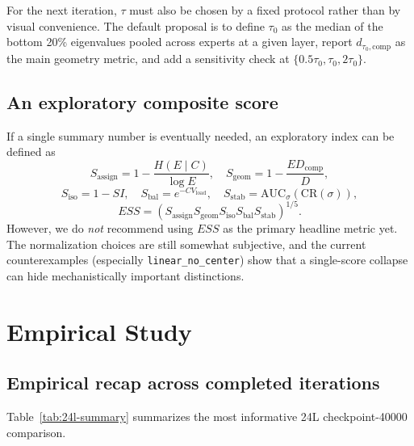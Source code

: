 \documentclass[11pt]{article}
\newcommand{\idea}[1]{\textcolor{red}{[#1]}}
\begin{document}
For the next iteration, $\tau$ must also be chosen by a fixed protocol rather than by visual convenience. The default proposal is to define $\tau_0$ as the median of the bottom 20\% eigenvalues pooled across experts at a given layer, report $d_{\tau_0,\mathrm{comp}}$ as the main geometry metric, and add a sensitivity check at $\{0.5\tau_0,\tau_0,2\tau_0\}$.

\subsection{An exploratory composite score}
If a single summary number is eventually needed, an exploratory index can be defined as
\[
S_{\mathrm{assign}} = 1-\frac{H(E\mid C)}{\log E},
\quad
S_{\mathrm{geom}} = 1-\frac{ED_{\mathrm{comp}}}{D},
\]
\[
S_{\mathrm{iso}} = 1-SI,
\quad
S_{\mathrm{bal}} = e^{-CV_{\mathrm{load}}},
\quad
S_{\mathrm{stab}} = \mathrm{AUC}_{\sigma}(\mathrm{CR}(\sigma)),
\]
\[
ESS =
\left(
S_{\mathrm{assign}}
S_{\mathrm{geom}}
S_{\mathrm{iso}}
S_{\mathrm{bal}}
S_{\mathrm{stab}}
\right)^{1/5}.
\]
However, we do \emph{not} recommend using $ESS$ as the primary headline metric yet. The normalization choices are still somewhat subjective, and the current counterexamples (especially \texttt{linear\_no\_center}) show that a single-score collapse can hide mechanistically important distinctions.

\section{Empirical Study}


\subsection{Empirical recap across completed iterations}
Table~\ref{tab:24l-summary} summarizes the most informative 24L checkpoint-40000 comparison.
\end{document}
